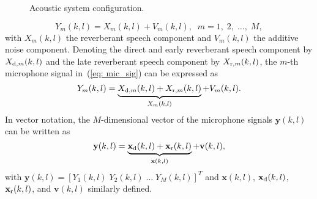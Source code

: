 \documentclass[10pt]{IEEEtran}
\begin{document}
\begin{figure}[b!]
  \caption{Acoustic system configuration.}
  \label{fig: ac_sys}
\end{figure}
\begin{equation}
\label{eq: mic_sig}
Y_m(k,l) = X_{m}(k,l) + V_{m}(k,l), \; \; m = 1, \; 2, \; \ldots, \; M,
\end{equation}
with $X_{m}(k,l)$ the reverberant speech component and $V_{m}(k,l)$ the additive noise component.
Denoting the direct and early reverberant speech component by $X_{{\rm d}, m}(k,l)$ and the late reverberant speech component by $X_{{\rm r}, m}(k,l)$, the $m$-th microphone signal in~(\ref{eq: mic_sig}) can be expressed as
\begin{equation}
Y_m(k,l) = \underbrace{X_{{\rm d},m}(k,l) + X_{{\rm r},m}(k,l)}_{X_m(k,l)} + V_{m}(k,l).
\end{equation}
In vector notation, the $M$-dimensional vector of the microphone signals $\mathbf{y}(k,l)$ can be written as
\begin{equation}
\mathbf{y}(k,l) = \underbrace{\mathbf{x}_{\rm d}(k,l) + \mathbf{x}_{\rm r}(k,l)}_{\mathbf{x}(k,l)} + \mathbf{v}(k,l),
\end{equation}
with $\mathbf{y}(k,l) = [Y_1(k,l) \; Y_2(k,l) \; \ldots \; Y_M(k,l)]^T$ and $\mathbf{x}(k,l)$, $\mathbf{x}_{\rm d}(k,l)$, $\mathbf{x}_{\rm r}(k,l)$, and $\mathbf{v}(k,l)$ similarly defined.
\end{document}
